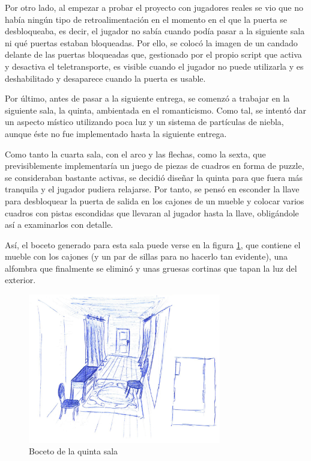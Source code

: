 Por otro lado, al empezar a probar el proyecto con jugadores reales se vio que no había ningún tipo de retroalimentación en el momento en el que la puerta se desbloqueaba, es decir, el jugador no sabía cuando podía pasar a la siguiente sala ni qué puertas estaban bloqueadas. Por ello, se colocó la imagen de un candado delante de las puertas bloqueadas que, gestionado por el propio script que activa y desactiva el teletransporte, es visible cuando el jugador no puede utilizarla y es deshabilitado y desaparece cuando la puerta es usable.

Por último, antes de pasar a la siguiente entrega, se comenzó a trabajar en la siguiente sala, la quinta, ambientada en el romanticismo. Como tal, se intentó dar un aspecto místico utilizando poca luz y un sistema de partículas de niebla, aunque éste no fue implementado hasta la siguiente entrega.

Como tanto la cuarta sala, con el arco y las flechas, como la sexta, que previsiblemente implementaría un juego de piezas de cuadros en forma de puzzle, se consideraban bastante activas, se decidió diseñar la quinta para que fuera más tranquila y el jugador pudiera relajarse. Por tanto, se pensó en esconder la llave para desbloquear la puerta de salida en los cajones de un mueble y colocar varios cuadros con pistas escondidas que llevaran al jugador hasta la llave, obligándole así a examinarlos con detalle.

Así, el boceto generado para esta sala puede verse en la figura \ref{fig:boceto-sala-5}, que contiene el mueble con los cajones (y un par de sillas para no hacerlo tan evidente), una alfombra que finalmente se eliminó y unas gruesas cortinas que tapan la luz del exterior.

\begin{figure}[!h]
\begin{center}
\includegraphics[width=0.75\textwidth]{imagenes/7/bocetos/boceto-sala-5.png}
\caption{Boceto de la quinta sala}
\label{fig:boceto-sala-5}
\end{center}
\end{figure}

